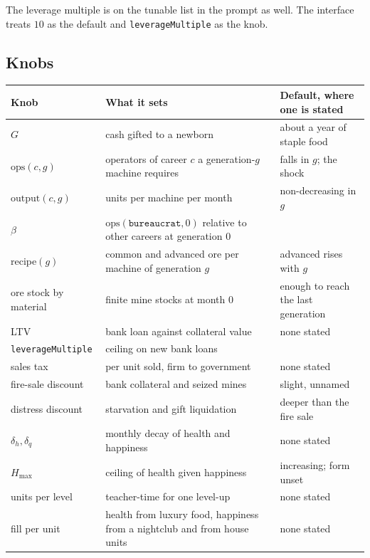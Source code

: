 \documentclass[11pt]{article}
\begin{document}
The leverage multiple is on the tunable list in the prompt as well. The
interface treats $10$ as the default and \texttt{leverageMultiple} as the
knob.

\subsection{Knobs}

\begin{center}
\footnotesize
\begin{longtable}{@{}>{\RaggedRight\hyphenpenalty=10000\arraybackslash}p{3.5cm}>{\RaggedRight\hyphenpenalty=10000\arraybackslash}p{6.2cm}>{\RaggedRight\hyphenpenalty=10000\arraybackslash}p{4.5cm}@{}}
\toprule
Knob & What it sets & Default, where one is stated \\
\midrule
\endhead
$G$ & cash gifted to a newborn & about a year of staple food \\
$\mathrm{ops}(c, g)$ & operators of career $c$ a generation-$g$ machine requires & falls in $g$; the shock \\
$\mathrm{output}(c, g)$ & units per machine per month & non-decreasing in $g$ \\
$\beta$ & $\mathrm{ops}(\texttt{bureaucrat}, 0)$ relative to other careers at generation 0 & 1 \\
recipe$(g)$ & common and advanced ore per machine of generation $g$ & advanced rises with $g$ \\
ore stock by material & finite mine stocks at month 0 & enough to reach the last generation \\
LTV & bank loan against collateral value & none stated \\
\texttt{leverageMultiple} & ceiling on new bank loans & 10 \\
sales tax & per unit sold, firm to government & none stated \\
fire-sale discount & bank collateral and seized mines & slight, unnamed \\
distress discount & starvation and gift liquidation & deeper than the fire sale \\
$\delta_{h}, \delta_{q}$ & monthly decay of health and happiness & none stated \\
$H_{\max}$ & ceiling of health given happiness & increasing; form unset \\
units per level & teacher-time for one level-up & none stated \\
fill per unit & health from luxury food, happiness from a nightclub and from house units & none stated \\

\end{longtable}
\end{center}
\end{document}
